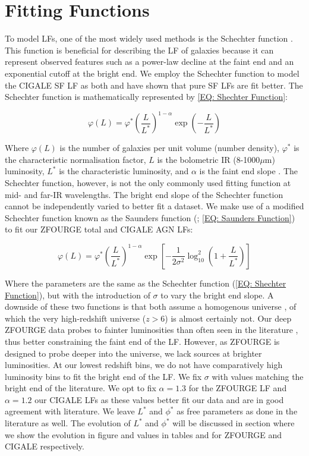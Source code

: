 \section{Fitting Functions}
To model LFs, one of the most widely used methods is the Schechter function \citep{schechter_analytic_1976}. This function is beneficial for describing the LF of galaxies because it can represent observed features such as a power-law decline at the faint end and an exponential cutoff at the bright end. We employ the Schechter function to model the CIGALE SF LF as both \cite{fu_decomposing_2010} and \cite{wu_mid-infrared_2011} have shown that pure SF LFs are fit better. The Schechter function is mathematically represented by \cref{EQ: Shechter Function}:

\begin{equation} 
    \varphi(L) = \varphi^* \left(\frac{L}{L^*}\right)^{1-\alpha} \exp\left(-\frac{L}{L^*}\right) 
    \label{EQ: Shechter Function}
\end{equation}

Where $\varphi(L)$ is the number of galaxies per unit volume (number density), $\varphi^*$ is the characteristic normalisation factor, $L$ is the bolometric IR (8-1000$\mu$m) luminosity, $L^*$ is the characteristic luminosity, and $\alpha$ is the faint end slope \citep{schechter_analytic_1976}. The Schechter function, however, is not the only commonly used fitting function at mid- and far-IR wavelengths. The bright end slope of the Schechter function cannot be independently varied to better fit a dataset. We make use of a modified Schechter function known as the Saunders function (\citealp{saunders_60-mum_1990}; \cref{EQ: Saunders Function}) to fit our ZFOURGE total and CIGALE AGN LFs:

\begin{equation} 
    \varphi(L) = \varphi^* \left(\frac{L}{L^*}\right)^{1-\alpha} \exp\left[-\frac{1}{2\sigma^2}\log_{10}^2\left(1+\frac{L}{L^*}\right)\right]
    \label{EQ: Saunders Function}
\end{equation}

Where the parameters are the same as the Schechter function (\cref{EQ: Shechter Function}), but with the introduction of $\sigma$ to vary the bright end slope. A downside of these two functions is that both assume a homogenous universe \citep{goto_luminosity_2011}, of which the very high-redshift universe ($z>6$) is almost certainly not. Our deep ZFOURGE data probes to fainter luminosities than often seen in the literature \citep{gruppioni_herschel_2013, rodighiero_mid-_2010}, thus better constraining the faint end of the LF. However, as ZFOURGE is designed to probe deeper into the universe, we lack sources at brighter luminosities. At our lowest redshift bins, we do not have comparatively high luminosity bins to fit the bright end of the LF. We fix $\sigma$ with values matching the bright end of the literature. We opt to fix $\alpha=1.3$ for the ZFOURGE LF and $\alpha=1.2$ our CIGALE LFs as these values better fit our data and are in good agreement with literature. We leave $L^{*}$ and $\phi^{*}$ as free parameters as done in the literature as well. The evolution of $L^{*}$ and $\phi^{*}$ will be discussed in section  where we show the evolution in figure and values in tables and  for ZFOURGE and CIGALE respectively.